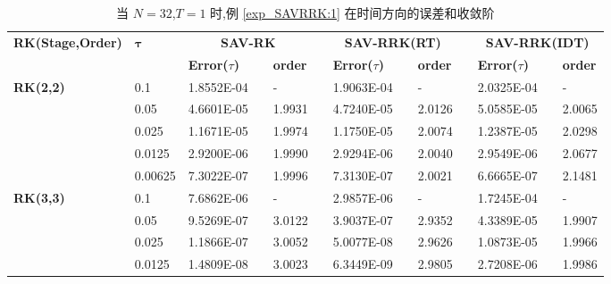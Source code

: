 \begin{table}[H]\scriptsize
\centering
\caption{当 $N=32$,$T = 1$ 时,例 \ref{exp_SAVRRK:1} 在时间方向的误差和收敛阶}
\begin{tabular}{lllllrlrlrlrlrl}
\toprule
\multicolumn{2}{l}{\multirow{2}[3]{*}{\textbf{RK(Stage,Order)}}} & \multicolumn{2}{l}{\multirow{2}[3]{*}{$\bm{\tau}$}} & \multicolumn{3}{c}{\textbf{SAV-RK}} &       & \multicolumn{3}{c}{\textbf{SAV-RRK(RT)}} &       & \multicolumn{3}{c}{\textbf{SAV-RRK(IDT)}} \\
\cmidrule{5-7}\cmidrule{9-11}\cmidrule{13-15}    \multicolumn{2}{l}{} & \multicolumn{2}{l}{} & \textbf{Error($\tau$)} &       & \textbf{order} &       & \textbf{Error($\tau$)} &       & \textbf{order} &       & \textbf{Error($\tau$)} &       & \textbf{order} \\
\hline
\multicolumn{2}{l}{\multirow{5}[0]{*}{\textbf{RK(2,2)}}} & \multicolumn{2}{l}{0.1} & 1.8552E-04 &       & -     &       & 1.9063E-04 &       & -     &       & 2.0325E-04 &       & - \\
\multicolumn{2}{l}{} & \multicolumn{2}{l}{0.05} & 4.6601E-05 &       & 1.9931  &       & 4.7240E-05 &       & 2.0126  &       & 5.0585E-05 &       & 2.0065  \\
\multicolumn{2}{l}{} & \multicolumn{2}{l}{0.025} & 1.1671E-05 &       & 1.9974  &       & 1.1750E-05 &       & 2.0074  &       & 1.2387E-05 &       & 2.0298  \\
\multicolumn{2}{l}{} & \multicolumn{2}{l}{0.0125} & 2.9200E-06 &       & 1.9990  &       & 2.9294E-06 &       & 2.0040  &       & 2.9549E-06 &       & 2.0677  \\
\multicolumn{2}{l}{} & \multicolumn{2}{l}{0.00625} & 7.3022E-07 &       & 1.9996  &       & 7.3130E-07 &       & 2.0021  &       & 6.6665E-07 &       & 2.1481  \\
\multicolumn{2}{l}{\multirow{5}[0]{*}{\textbf{RK(3,3)}}} & \multicolumn{2}{l}{0.1} & 7.6862E-06 &       & -     &       & 2.9857E-06 &       & -     &       & 1.7245E-04 &       & - \\
\multicolumn{2}{l}{} & \multicolumn{2}{l}{0.05} & 9.5269E-07 &       & 3.0122  &       & 3.9037E-07 &       & 2.9352  &       & 4.3389E-05 &       & 1.9907  \\
\multicolumn{2}{l}{} & \multicolumn{2}{l}{0.025} & 1.1866E-07 &       & 3.0052  &       & 5.0077E-08 &       & 2.9626  &       & 1.0873E-05 &       & 1.9966  \\
\multicolumn{2}{l}{} & \multicolumn{2}{l}{0.0125} & 1.4809E-08 &       & 3.0023  &       & 6.3449E-09 &       & 2.9805  &       & 2.7208E-06 &       & 1.9986  \\

\end{tabular}
\end{table}

